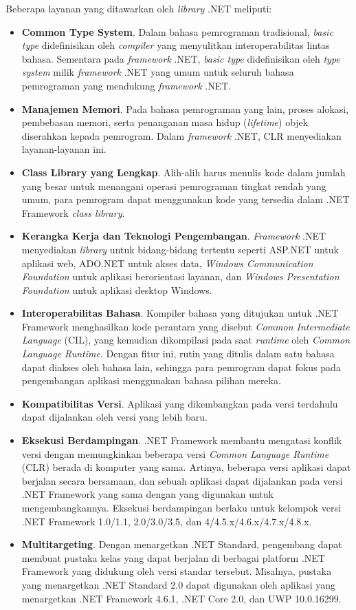 Beberapa layanan yang ditawarkan oleh \textit{library} .NET meliputi:
\begin{itemize}
    \item \textbf{Common Type System}. Dalam bahasa pemrograman tradisional, \textit{basic type} didefinisikan oleh \textit{compiler} yang menyulitkan interoperabilitas lintas bahasa. Sementara pada \textit{framework} .NET, \textit{basic type} didefinisikan oleh \textit{type system} milik \textit{framework} .NET yang umum untuk seluruh bahasa pemrograman yang mendukung \textit{framework} .NET.
    \item \textbf{Manajemen Memori}. Pada bahasa pemrograman yang lain, proses alokasi, pembebasan memori, serta penanganan masa hidup (\textit{lifetime}) objek diserahkan kepada pemrogram. Dalam \textit{framework} .NET, CLR menyediakan layanan-layanan ini.
    \item \textbf{Class Library yang Lengkap}. Alih-alih harus menulis kode dalam jumlah yang besar untuk menangani operasi pemrograman tingkat rendah yang umum, para pemrogram dapat menggunakan kode yang tersedia dalam .NET Framework \textit{class library}.
    \item \textbf{Kerangka Kerja dan Teknologi Pengembangan}. \textit{Framework} .NET menyediakan \textit{library} untuk bidang-bidang tertentu seperti ASP.NET untuk aplikasi web, ADO.NET untuk akses data, \textit{Windows Communication Foundation} untuk aplikasi berorientasi layanan, dan \textit{Windows Presentation Foundation} untuk aplikasi desktop Windows.
    \item \textbf{Interoperabilitas Bahasa}. Kompiler bahasa yang ditujukan untuk .NET Framework menghasilkan kode perantara yang disebut \textit{Common Intermediate Language} (CIL), yang kemudian dikompilasi pada saat \textit{runtime} oleh \textit{Common Language Runtime}. Dengan fitur ini, rutin yang ditulis dalam satu bahasa dapat diakses oleh bahasa lain, sehingga para pemrogram dapat fokus pada pengembangan aplikasi menggunakan bahasa pilihan mereka.
    \item \textbf{Kompatibilitas Versi}. Aplikasi yang dikembangkan pada versi terdahulu dapat dijalankan oleh versi yang lebih baru.
    \item \textbf{Eksekusi Berdampingan}. .NET Framework membantu mengatasi konflik versi dengan memungkinkan beberapa versi \textit{Common Language Runtime} (CLR) berada di komputer yang sama. Artinya, beberapa versi aplikasi dapat berjalan secara bersamaan, dan sebuah aplikasi dapat dijalankan pada versi .NET Framework yang sama dengan yang digunakan untuk mengembangkannya. Eksekusi berdampingan berlaku untuk kelompok versi .NET Framework 1.0/1.1, 2.0/3.0/3.5, dan 4/4.5.x/4.6.x/4.7.x/4.8.x.
    \item \textbf{Multitargeting}. Dengan menargetkan .NET Standard, pengembang dapat membuat pustaka kelas yang dapat berjalan di berbagai platform .NET Framework yang didukung oleh versi standar tersebut. Misalnya, pustaka yang menargetkan .NET Standard 2.0 dapat digunakan oleh aplikasi yang menargetkan .NET Framework 4.6.1, .NET Core 2.0, dan UWP 10.0.16299.
\end{itemize}